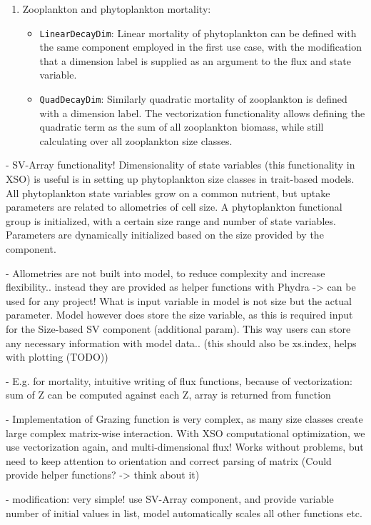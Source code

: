 \documentclass[journal abbreviation, manuscript]{copernicus}
\begin{document}
\begin{enumerate}
        \item Zooplankton and phytoplankton mortality: 
    \begin{itemize}
        \item \texttt{LinearDecayDim}: Linear mortality of phytoplankton can be defined with the same component employed in the first use case, with the modification that a dimension label is supplied as an argument to the flux and state variable. 
        \item \texttt{QuadDecayDim}: Similarly quadratic mortality of zooplankton is defined with a dimension label. The vectorization functionality allows defining the quadratic term as the sum of all zooplankton biomass, while still calculating over all zooplankton size classes.
    \end{itemize}
\end{enumerate}


- SV-Array functionality! Dimensionality of state variables (this functionality in XSO) is useful is in setting up phytoplankton size classes in trait-based models. All phytoplankton state variables grow on a common nutrient, but uptake parameters are related to allometries of cell size. A phytoplankton functional group is initialized, with a certain size range and number of state variables. Parameters are dynamically initialized based on the size provided by the component. 

- Allometries are not built into model, to reduce complexity and increase flexibility.. instead they are provided as helper functions with Phydra -> can be used for any project! What is input variable in model is not size but the actual parameter. Model however does store the size variable, as this is required input for the Size-based SV component (additional param). This way users can store any necessary information with model data.. (this should also be xs.index, helps with plotting (TODO))

- E.g. for mortality, intuitive writing of flux functions, because of vectorization: sum of Z can be computed against each Z, array is returned from function

- Implementation of Grazing function is very complex, as many size classes create large complex matrix-wise interaction. With XSO computational optimization, we use vectorization again, and multi-dimensional flux! Works without problems, but need to keep attention to orientation and correct parsing of matrix (Could provide helper functions? -> think about it)

- modification: very simple! use SV-Array component, and provide variable number of initial values in list, model automatically scales all other functions etc.
\end{document}
